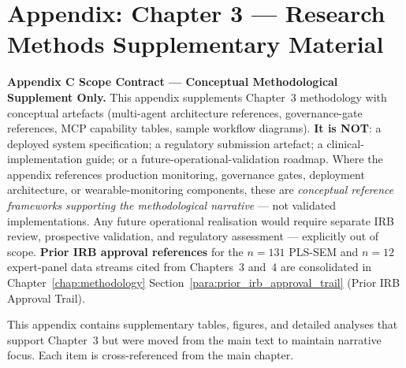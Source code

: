
\chapter*{Appendix: Chapter 3 --- Research Methods Supplementary Material}
\label{chap:appendix_ch3}
\label{app:ch3_support_appx}
\normalsize\normalfont\color{black}
\label{app:ch3_support}

\renewcommand{\tabfixsetup}{\sloppy\hyphenpenalty=0\exhyphenpenalty=0\tolerance=9999\emergencystretch=8em\hfuzz=100pt\hbadness=9999}
\label{fig:pii_flow}
\label{tab:mcp_capabilities}

\noindent\textbf{Appendix C Scope Contract --- Conceptual Methodological Supplement Only.}
\label{para:appc_scope_contract}
This appendix supplements Chapter~3 methodology with conceptual artefacts (multi-agent architecture references, governance-gate references, MCP capability tables, sample workflow diagrams). \textbf{It is NOT}: a deployed system specification; a regulatory submission artefact; a clinical-implementation guide; or a future-operational-validation roadmap. Where the appendix references production monitoring, governance gates, deployment architecture, or wearable-monitoring components, these are \emph{conceptual reference frameworks supporting the methodological narrative} --- not validated implementations. Any future operational realisation would require separate IRB review, prospective validation, and regulatory assessment --- explicitly out of scope. \textbf{Prior IRB approval references} for the $n{=}131$ PLS-SEM and $n{=}12$ expert-panel data streams cited from Chapters~3 and~4 are consolidated in Chapter~\ref{chap:methodology} Section~\ref{para:prior_irb_approval_trail} (Prior IRB Approval Trail).

This appendix contains supplementary tables, figures, and detailed analyses that support Chapter~3 but were moved from the main text to maintain narrative focus. Each item is cross-referenced from the main chapter.

